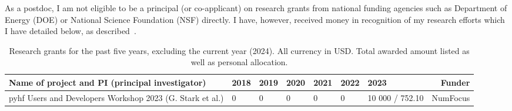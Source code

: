 As a postdoc, I am not eligible to be a principal (or co-applicant) on research grants from national funding agencies such as Department of Energy (DOE) or National Science Foundation (NSF) directly. I have, however, received money in recognition of my research efforts which I have detailed below, as described~.

\begin{table}[h!]
	\footnotesize
	\centering
	\caption{Research grants for the past five years, excluding the current year (2024). All currency in USD. Total awarded amount listed as well as personal allocation.}
	\begin{tabular}{p{8em}|p{4em}|p{4em}|p{4em}|p{4em}|p{4em}|p{4em}|r}
		\rowcolor{black!30}
		\textbf{Name of project and PI (principal investigator)}  & \textbf{2018} & \textbf{2019} & \textbf{2020} & \textbf{2021} & \textbf{2022} & \textbf{2023}   & \textbf{Funder} \\
		\hline
		pyhf Users and Developers Workshop 2023 (G. Stark et al.) & 0             & 0             & 0             & 0             & 0             & 10 000 / 752.10 & NumFocus        \\
	\end{tabular}
\end{table}
